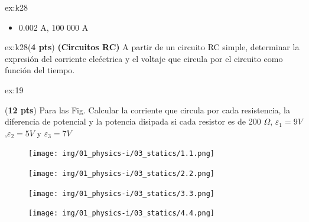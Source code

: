 \begin{multicols}{2}
\begin{excercise}[][][]{ex:k28}
{\begin{itemize}
\begin{itemize}
                    \item 0.002 A, 100 000 A
                \end{itemize}
        \end{itemize}
         }
    \end{excercise}
        \begin{excercise}[][][]{ex:k28}{(\textbf{4 pts})
        \textbf{(Circuitos RC)}
            A partir de un circuito RC simple, determinar la expresión del corriente eleéctrica y el voltaje que circula por el circuito como función del tiempo.
             \vspace{8cm}
         }
    \end{excercise}
   
    \begin{excercise}[][][]{ex:19}{(\textbf{12 pts})
       Para las Fig. Calcular la corriente que circula por cada resistencia, la diferencia de potencial y la potencia disipada si cada resistor es de 200 $\Omega$, $\varepsilon_1=9V$,$\varepsilon_2=5V$ y $\varepsilon_3=7V$ 
        \begin{figure}[H]
            \centering
            \texttt{[image: img/01\_physics-i/03\_statics/1.1.png]}
        \end{figure}
         \begin{figure}[H]
            \centering
            \texttt{[image: img/01\_physics-i/03\_statics/2.2.png]}
        \end{figure} 
    } 
          \begin{figure}[H]
            \centering
            \texttt{[image: img/01\_physics-i/03\_statics/3.3.png]}
        \end{figure}
         \begin{figure}[H]
            \centering
            \texttt{[image: img/01\_physics-i/03\_statics/4.4.png]}
        \end{figure}
    \end{excercise}
\end{multicols}
